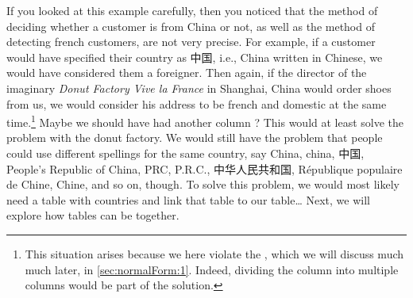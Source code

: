 If you looked at this example carefully, then you noticed that the method of deciding whether a customer is from China or not, as well as the method of detecting french customers, are not very precise.
For example, if a customer would have specified their country as 中国, i.e., China written in Chinese, we would have considered them a foreigner.
Then again, if the director of the imaginary \emph{Donut Factory Vive la France} in Shanghai, China would order shoes from us, we would consider his address to be french and domestic at the same time.\footnote{%
This situation arises because we here violate the , which we will discuss much much later, in \cref{sec:normalForm:1}. %
Indeed, dividing the  column into multiple columns would be part of the solution.}
Maybe we should have had another column ?
This would at least solve the problem with the donut factory.
We would still have the problem that people could use different spellings for the same country, say China, china, 中国, People's Republic of China, PRC, P.R.C., 中华人民共和国, République populaire de Chine, Chine, and so on, though.
To solve this problem, we would most likely need a table with countries and link that table to our  table\dots
Next, we will explore how tables can be  together.%
%
\FloatBarrier%
\endhsection%
%
